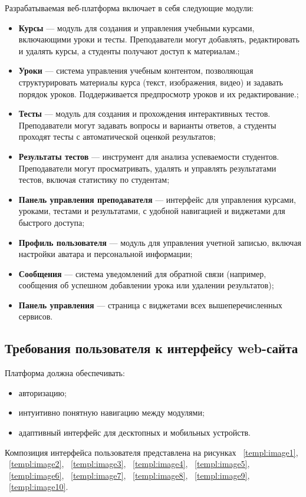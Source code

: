 Разрабатываемая веб-платформа включает в себя следующие модули:
\begin{itemize}
\item \textbf{Курсы} — модуль для создания и управления учебными курсами, включающими уроки и тесты. Преподаватели могут добавлять, редактировать и удалять курсы, а студенты получают доступ к материалам.;
\item \textbf{Уроки} — система управления учебным контентом, позволяющая структурировать материалы курса (текст, изображения, видео) и задавать порядок уроков. Поддерживается предпросмотр уроков и их редактирование.;
\item \textbf{Тесты} — модуль для создания и прохождения интерактивных тестов. Преподаватели могут задавать вопросы и варианты ответов, а студенты проходят тесты с автоматической оценкой результатов;
\item \textbf{Результаты тестов} — инструмент для анализа успеваемости студентов. Преподаватели могут просматривать, удалять и управлять результатами тестов, включая статистику по студентам;
\item \textbf{Панель управления преподавателя} — интерфейс для управления курсами, уроками, тестами и результатами, с удобной навигацией и виджетами для быстрого доступа;
\item \textbf{Профиль пользователя} — модуль для управления учетной записью, включая настройки аватара и персональной информации;
\item \textbf{Сообщения} — система уведомлений для обратной связи (например, сообщения об успешном добавлении урока или удалении результатов);
\item \textbf{Панель управления} — страница с виджетами всех вышеперечисленных сервисов.
\end{itemize}

\subsection{Требования пользователя к интерфейсу web-сайта}

Платформа должна обеспечивать:
\begin{itemize}
    \item авторизацию;
    \item интуитивно понятную навигацию между модулями;
    \item адаптивный интерфейс для десктопных и мобильных устройств.
\end{itemize}

Композиция интерфейса пользователя представлена на рисунках ~\ref{templ:image1}, ~\ref{templ:image2}, ~\ref{templ:image3}, ~\ref{templ:image4}, ~\ref{templ:image5}, ~\ref{templ:image6}, ~\ref{templ:image7}, ~\ref{templ:image8}, ~\ref{templ:image9},  ~\ref{templ:image10}.

